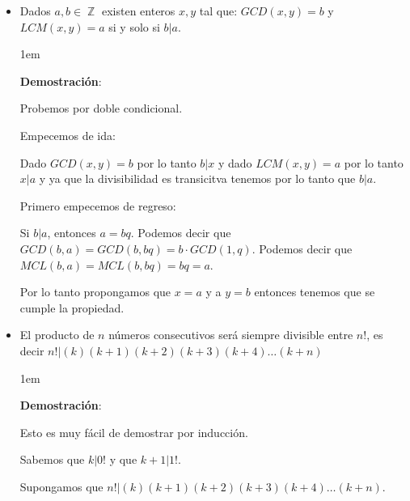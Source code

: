 \documentclass[12pt, fleqn]{report}                             %
\newenvironment{SmallIndentation}[1][0.75em]                    %
    {\begin{adjustwidth}{#1}{}\begin{footnotesize}}                 %
    {\end{footnotesize}\end{adjustwidth}}                           %
\DeclareMathOperator \Integers  {\mathbb{Z}}                     %
\begin{document}
\begin{itemize}
\begin{SmallIndentation}[1em]
                    Y bingo, demostrado ;)

                \end{SmallIndentation}

            \item Dados $a, b \in \Integers$ existen enteros $x, y$ tal que: 
                $GCD(x, y) = b$  y $LCM(x, y) = a$ si y solo si $b|a$.

                \begin{SmallIndentation}[1em]
                    \textbf{Demostración}:

                    Probemos por doble condicional.

                    Empecemos de ida:
                    
                    Dado $GCD(x, y) = b$ por lo tanto $b|x$ y dado $LCM(x, y) = a$ por lo tanto $x|a$
                    y ya que la divisibilidad es transicitva tenemos por lo tanto que $b|a$.


                    Primero empecemos de regreso:

                    Si $b|a$, entonces $a = bq$.
                    Podemos decir que $GCD(b, a) = GCD(b, bq) = b \cdot GCD(1, q)$.
                    Podemos decir que $MCL(b, a) = MCL(b, bq) = bq = a$.

                    Por lo tanto propongamos que $x=a$ y a $y=b$ entonces tenemos que 
                    se cumple la propiedad.

                \end{SmallIndentation}

            \clearpage

            \item El producto de $n$ números consecutivos será siempre divisible entre
                $n!$, es decir $n! | (k)(k+1)(k+2)(k+3)(k+4)\dots(k+n)$

                \begin{SmallIndentation}[1em]
                    \textbf{Demostración}:

                    Esto es muy fácil de demostrar por inducción.

                    Sabemos que $k|0!$ y que $k+1|1!$.

                    Supongamos que $n! | (k)(k+1)(k+2)(k+3)(k+4)\dots(k+n)$.


\end{SmallIndentation}
\end{itemize}
\end{document}

